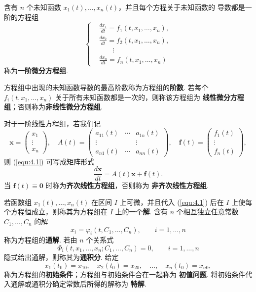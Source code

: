 \begin{deff}[(一阶微分方程组及其解与初值问题)]
含有 $n$ 个未知函数 $x_1(t),\ldots,x_n(t)$，并且每个方程关于未知函数的
导数都是一阶的方程组
\begin{equation}\label{equ:4.1}
\left\{
\begin{aligned}
&\frac{dx_1}{dt}=f_1(t,x_1,\ldots,x_n),\\
&\frac{dx_2}{dt}=f_2(t,x_1,\ldots,x_n),\\
&\qquad\vdots\\
&\frac{dx_n}{dt}=f_n(t,x_1,\ldots,x_n)
\end{aligned}
\right.
\end{equation}
称为\textbf{一阶微分方程组}.

方程组中出现的未知函数导数的最高阶数称为方程组的\textbf{阶数}. 若每个
$f_i(t,x_1,\ldots,x_n)$ 关于所有未知函数都是一次的，则称该方程组为
\textbf{线性微分方程组}；否则称为\textbf{非线性微分方程组}.

对于一阶线性方程组，若我们记
\[
\bm{x}=
\begin{pmatrix}
x_1\\ \vdots\\ x_n
\end{pmatrix},\quad
A(t)=
\begin{pmatrix}
a_{11}(t)&\cdots&a_{1n}(t)\\
\vdots&&\vdots\\
a_{n1}(t)&\cdots&a_{nn}(t)
\end{pmatrix},\quad
\bm{f}(t)=
\begin{pmatrix}
f_1(t)\\ \vdots\\ f_n(t)
\end{pmatrix},
\]
则 (\ref{equ:4.1}) 可写成矩阵形式
\begin{equation}\label{equ:4.2}
\frac{d\bm{x}}{dt}=A(t)\bm{x}+\bm{f}(t).
\end{equation}
当 $\bm{f}(t)\equiv\bm{0}$ 时称为\textbf{齐次线性方程组}，否则称为
\textbf{非齐次线性方程组}.

若函数组 $x_1(t),\ldots,x_n(t)$ 在区间 $I$ 上可微，并且代入
(\ref{equ:4.1}) 后在 $I$ 上使每个方程恒成立，则称其为方程组在
$I$ 上的一个\textbf{解}. 含有 $n$ 个相互独立任意常数
$C_1,\ldots,C_n$ 的解
\[
x_i=\varphi_i(t,C_1,\ldots,C_n),\qquad i=1,\ldots,n
\]
称为方程组的\textbf{通解}. 若由 $n$ 个关系式
\[
\Phi_i(t,x_1,\ldots,x_n;C_1,\ldots,C_n)=0,
\qquad i=1,\ldots,n
\]
隐式给出通解，则称其为\textbf{通积分}. 给定
\begin{equation}\label{equ:4.3}
x_1(t_0)=x_{10},\quad x_2(t_0)=x_{20},\quad\ldots,\quad x_n(t_0)=x_{n0},
\end{equation}
称为方程组的\textbf{初始条件}；方程组与初始条件合在一起称为
\textbf{初值问题}. 将初始条件代入通解或通积分确定常数后所得的解称为
\textbf{特解}.
\end{deff}

